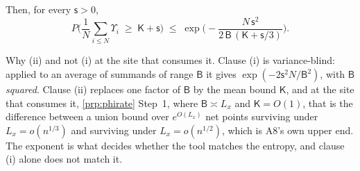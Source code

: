 \begin{lemma}
\begin{enumerate}
Then,
for every $\mathsf s>0$,
\begin{equation}\label{eq:bernstein}
P\Big(\frac1N\sum_{i\le N}\varUpsilon_i\;\ge\;\mathsf K+\mathsf s\Big)
\;\le\;\exp\Big(-\frac{N\,\mathsf s^{2}}{2\,\mathsf B\,(\mathsf K+\mathsf s/3)}\Big) .
\end{equation}
\end{enumerate}
Why (ii) and not (i) at the site that consumes it. Clause (i) is variance-blind: applied to an
average of summands of range $\mathsf B$ it gives $\exp(-2\mathsf s^{2}N/\mathsf B^{2})$, with
$\mathsf B$ \emph{squared}. Clause (ii) replaces one factor of $\mathsf B$ by the mean bound
$\mathsf K$, and at the site that consumes it, \cref{prp:phirate} Step~1, where
$\mathsf B\asymp L_x$ and $\mathsf K=O(1)$, that is the difference between a union bound over
$e^{O(L_x)}$ net points surviving under $L_x=o(n^{1/3})$ and surviving under $L_x=o(n^{1/2})$, which is
A8's own upper end. The exponent is what decides whether the tool matches the entropy, and clause
(i) alone does not match it.
\end{lemma}

